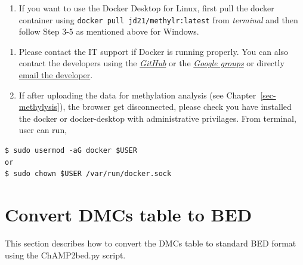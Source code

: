 \documentclass[
  a4paper,
  oneside,
  open=any]{scrreport}
\providecommand{\tightlist}{%
  \setlength{\itemsep}{0pt}\setlength{\parskip}{0pt}}\usepackage{longtable,booktabs,array}
\begin{document}
\begin{enumerate}
\def\labelenumi{\arabic{enumi}.}
\setcounter{enumi}{1}
\tightlist
\item
  If you want to use the Docker Desktop for Linux, first pull the docker
  container using \texttt{docker\ pull\ jd21/methylr:latest} from
  \emph{terminal} and then follow Step 3-5 as mentioned above for
  Windows.
\end{enumerate}

\begin{tcolorbox}[enhanced jigsaw, left=2mm, colback=white, breakable, leftrule=.75mm, coltitle=black, toprule=.15mm, rightrule=.15mm, colbacktitle=quarto-callout-note-color!10!white, title=\textcolor{quarto-callout-note-color}{\faInfo}\hspace{0.5em}{Note}, opacitybacktitle=0.6, colframe=quarto-callout-note-color-frame, bottomrule=.15mm, bottomtitle=1mm, toptitle=1mm, titlerule=0mm, opacityback=0, arc=.35mm]

\begin{enumerate}
\def\labelenumi{\arabic{enumi}.}
\tightlist
\item
  Please contact the IT support if Docker is running properly. You can
  also contact the developers using the
  \href{https://github.com/JD2112/methylr/issues}{\emph{GitHub}} or the
  \href{https://groups.google.com/g/methylr}{\emph{Google groups}} or
  directly \href{mailto:methylr@googlegroups.com}{email the developer}.
\item
  If after uploading the data for methylation analysis (see
  Chapter~\ref{sec-methylysis}), the browser get disconnected, please
  check you have installed the docker or docker-desktop with
  administrative privilages. From terminal, user can run,
\end{enumerate}

\begin{verbatim}
$ sudo usermod -aG docker $USER
or
$ sudo chown $USER /var/run/docker.sock
\end{verbatim}

\end{tcolorbox}

\hypertarget{sec-bed}{%
\chapter{Convert DMCs table to BED}\label{sec-bed}}

This section describes how to convert the DMCs table to standard BED
format using the ChAMP2bed.py script.
\end{document}
